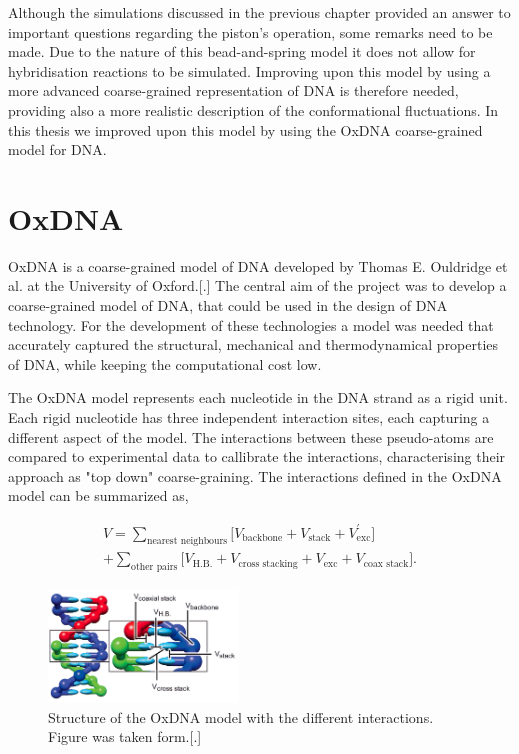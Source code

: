 \vspace{1cm}
\noindent Although the simulations discussed in the previous chapter provided an answer
to
important questions regarding the piston's operation, some remarks need to be made. Due
to the nature of this bead-and-spring model it does not allow for hybridisation reactions
to be simulated. Improving upon this model by using a more advanced coarse-grained
representation of DNA is therefore needed, providing also a more realistic description of
the conformational fluctuations. In this thesis we improved upon this model by using the
OxDNA coarse-grained model for DNA.\\


\section{OxDNA}


OxDNA is a coarse-grained model of DNA developed by Thomas E. Ouldridge et al. at the
University of Oxford.[.] The central aim of the project was to develop a coarse-grained
model of DNA, that could be used in the design of DNA technology. For the development of
these technologies a model was needed that accurately captured the structural, mechanical
and thermodynamical properties of DNA, while keeping the computational cost low.

The OxDNA model represents each nucleotide in the DNA strand as a rigid unit. Each rigid
nucleotide has three independent interaction sites, each capturing a different aspect of
the model. The interactions between these pseudo-atoms are compared to experimental
data to callibrate the interactions, characterising their approach as "top down"
coarse-graining. The interactions defined in the OxDNA model can be summarized as,

\begin{equation}
  \begin{aligned}
    V = \sum_{\text{nearest neighbours}} \bigg[ V_{\text{backbone}} + V_{\text{stack}} +
    V^{'}_{\text{exc}}\bigg]\\
    + \sum_{\text{other pairs}} \bigg[V_{\text{H.B.}} + V_{\text{cross stacking}} +
    V_{\text{exc}} + V_{\text{coax stack}}\bigg].
  \end{aligned}
\end{equation}

\begin{figure}
  \begin{center}
    \includegraphics[width=0.45\textwidth]{Figures/oxDNA_model.png}
  \end{center}
  \caption{Structure of the OxDNA model with the different interactions.
  Figure was taken form.[.]}
\end{figure}

